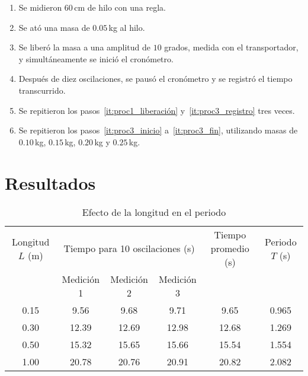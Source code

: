 \documentclass[twocolumn]{article}
\numberwithin{table}{section}
\begin{document}
\begin{enumerate}
  \item Se midieron 60\,cm de hilo con una regla.\label{it:proc3_inicio}
  \item Se ató una masa de $0.05$\,kg al hilo.
  \item Se liberó la masa a una amplitud de $10$ grados, medida con
    el transportador, y simultáneamente se inició el
    cronómetro.
  \item Después de diez oscilaciones, se pausó el cronómetro y se
    registró el tiempo transcurrido.\label{it:proc3_registro}
  \item Se repitieron los pasos~\ref{it:proc1_liberación}
    y~\ref{it:proc3_registro} tres veces.\label{it:proc3_fin}
  \item Se repitieron los pasos~\ref{it:proc3_inicio}
    a~\ref{it:proc3_fin}, utilizando masas de
    $0.10$\,kg, $0.15$\,kg, $0.20$\,kg y $0.25$\,kg.
\end{enumerate}

\newpage
\onecolumn
\section{Resultados}

\begin{table}[ht]
  \centering
  \caption{Efecto de la longitud en el periodo}\label{tab:longitud_periodo}
  \begin{tabular}{cccccc}
    \toprule
    Longitud $L$ (m) & \multicolumn{3}{c}{Tiempo para 10
    oscilaciones (s)} & Tiempo promedio (s) & Periodo $T$ (s) \\
    \cmidrule(lr){2-4}
    & Medición 1 & Medición 2 & Medición 3 &  &  \\
    \midrule
    0.15 &  9.56 &  9.68 &  9.71 &  9.65 & 0.965 \\
    0.30 & 12.39 & 12.69 & 12.98 & 12.68 & 1.269 \\
    0.50 & 15.32 & 15.65 & 15.66 & 15.54 & 1.554 \\
    1.00 & 20.78 & 20.76 & 20.91 & 20.82 & 2.082 \\
    \bottomrule
  \end{tabular}
\end{table}
\end{document}
